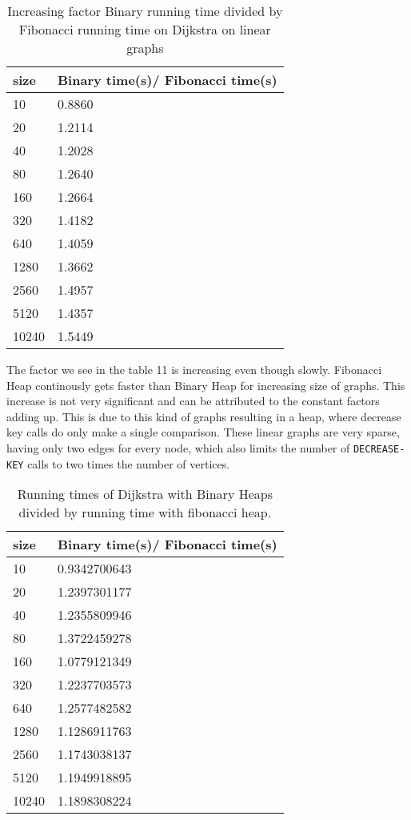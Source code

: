 \documentclass[a4paper,10pt]{article}
\begin{document}
\begin{table}
  \begin{center}
    \begin{tabular}{l|l}
      size & Binary time(s)/ Fibonacci time(s) \\
      \hline
      10    & 0.8860\\
      20    & 1.2114\\
      40    & 1.2028\\
      80    & 1.2640\\
      160   & 1.2664\\
      320   & 1.4182\\
      640   & 1.4059\\
      1280  & 1.3662\\
      2560  & 1.4957\\
      5120  & 1.4357\\
      10240 & 1.5449
    \end{tabular}
    \caption{Increasing factor Binary running time divided by Fibonacci running time on Dijkstra on linear graphs}
  \end{center}
\end{table}

The factor we see in the table 11 is increasing even though slowly. Fibonacci Heap continously gets faster than Binary Heap for increasing size of graphs. This increase is not very significant and can be attributed to the constant factors adding up. This is due to this kind of graphs resulting in a heap, where decrease key calls do only make a single comparison. These linear graphs are very sparse, having only two edges for every node, which also limits the number of \texttt{DECREASE\--KEY} calls to two times the number of vertices.

\begin{table}
  \begin{center}
    \begin{tabular}{l|l}
      size & Binary time(s)/ Fibonacci time(s) \\
      \hline
      10    & 0.9342700643\\
      20    & 1.2397301177\\
      40    & 1.2355809946\\
      80    & 1.3722459278\\
      160   & 1.0779121349\\
      320   & 1.2237703573\\
      640   & 1.2577482582\\
      1280  & 1.1286911763\\
      2560  & 1.1743038137\\
      5120  & 1.1949918895\\
      10240 & 1.1898308224
    \end{tabular}
    \caption{Running times of Dijkstra with Binary Heaps divided by running time with fibonacci heap.}
  \end{center}
\end{table}
\end{document}
